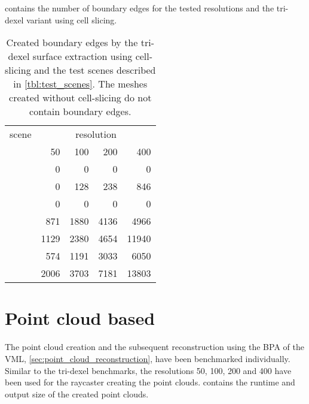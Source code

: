  contains the number of boundary edges for the tested resolutions and the tri-dexel variant using cell slicing.

\begin{table}
	\centering
	\begin{tabular}{l|r|r|r|r}
		scene          & \multicolumn{4}{c}{resolution} \\
		&   50 &  100 &  200 &   400 \\
		\midrule
		\cubes        &    0 &    0 &    0 &     0 \\
		\cylindersd   &    0 &  128 &  238 &   846 \\
		\cylinders    &    0 &    0 &    0 &     0 \\
		\cylinderhead &  871 & 1880 & 4136 &  4966 \\
		\impeller     & 1129 & 2380 & 4654 & 11940 \\
		\impellerhalf &  574 & 1191 & 3033 &  6050 \\
		\turbine      & 2006 & 3703 & 7181 & 13803 \\
	\end{tabular}
	\caption[Tri-dexel boundary edges]{
		Created boundary edges by the tri-dexel surface extraction using cell-slicing and the test scenes described in \cref{tbl:test_scenes}.
		The meshes created without cell-slicing do not contain boundary edges.
	}
	\label{tbl:tri_dexel_boundary edges}
\end{table}


\section{Point cloud based}
\label{sec:point_cloud_results}

The point cloud creation and the subsequent reconstruction using the BPA of the VML, \cf \cref{sec:point_cloud_reconstruction}, have been benchmarked individually.
Similar to the tri-dexel benchmarks, the resolutions 50, 100, 200 and 400 have been used for the raycaster creating the point clouds.
 contains the runtime and output size of the created point clouds.

